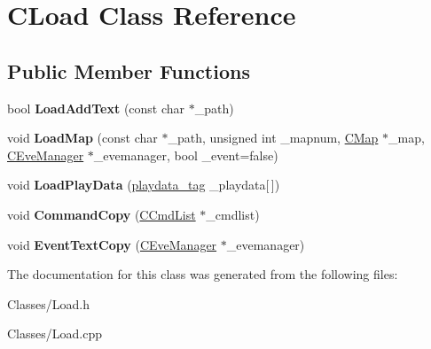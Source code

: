 \hypertarget{class_c_load}{}\section{C\+Load Class Reference}
\label{class_c_load}
\subsection*{Public Member Functions}
\begin{DoxyCompactItemize}
\item 
bool {\bfseries Load\+Add\+Text} (const char $\ast$\+\_\+path)\hypertarget{class_c_load_ad213efd3e154e1d5084795770f88db2b}{}\label{class_c_load_ad213efd3e154e1d5084795770f88db2b}

\item 
void {\bfseries Load\+Map} (const char $\ast$\+\_\+path, unsigned int \+\_\+mapnum, \hyperlink{class_c_map}{C\+Map} $\ast$\+\_\+map, \hyperlink{class_c_eve_manager}{C\+Eve\+Manager} $\ast$\+\_\+evemanager, bool \+\_\+event=false)\hypertarget{class_c_load_add5d5639d77f30edecda263bf32c608c}{}\label{class_c_load_add5d5639d77f30edecda263bf32c608c}

\item 
void {\bfseries Load\+Play\+Data} (\hyperlink{structplaydata__tag}{playdata\+\_\+tag} \+\_\+playdata\mbox{[}$\,$\mbox{]})\hypertarget{class_c_load_a101d280bf5246a3d9421c8b1f69bf1bf}{}\label{class_c_load_a101d280bf5246a3d9421c8b1f69bf1bf}

\item 
void {\bfseries Command\+Copy} (\hyperlink{class_c_cmd_list}{C\+Cmd\+List} $\ast$\+\_\+cmdlist)\hypertarget{class_c_load_a70838c218c15f8fa823beceece192a2d}{}\label{class_c_load_a70838c218c15f8fa823beceece192a2d}

\item 
void {\bfseries Event\+Text\+Copy} (\hyperlink{class_c_eve_manager}{C\+Eve\+Manager} $\ast$\+\_\+evemanager)\hypertarget{class_c_load_ae92a2bfb056d9aca923122abafd06858}{}\label{class_c_load_ae92a2bfb056d9aca923122abafd06858}

\end{DoxyCompactItemize}


The documentation for this class was generated from the following files\+:\begin{DoxyCompactItemize}
\item 
Classes/Load.\+h\item 
Classes/Load.\+cpp\end{DoxyCompactItemize}
